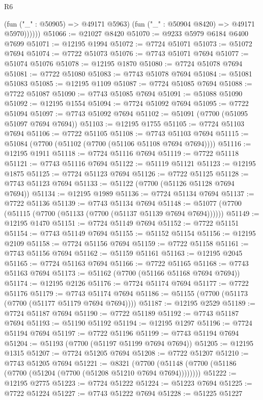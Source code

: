 \begin{lexlean}{R6}
\begin{coremodule}
              (fun ("_" : @50905) => @49171 @5963)
              (fun ("_" : @50904 @8420) => @49171 @5970))))))
@51066 := @21027 @8420
@51070 := @9233 @5979 @6184 @6400 @7699
@51071 := @12195 @1994
@51072 := @7724 @51071
@51073 := @51072 @7694
@51074 := @7722 @51073
@51076 := @7743 @51071 @7694
@51077 := @51074 @51076
@51078 := @12195 @1870
@51080 := @7724 @51078 @7694
@51081 := @7722 @51080
@51083 := @7743 @51078 @7694
@51084 := @51081 @51083
@51085 := @12195 @1109
@51087 := @7724 @51085 @7694
@51088 := @7722 @51087
@51090 := @7743 @51085 @7694
@51091 := @51088 @51090
@51092 := @12195 @1554
@51094 := @7724 @51092 @7694
@51095 := @7722 @51094
@51097 := @7743 @51092 @7694
@51102 := @51091 (@7700 (@51095 @51097 @7694 @7694))
@51103 := @12195 @1755
@51105 := @7724 @51103 @7694
@51106 := @7722 @51105
@51108 := @7743 @51103 @7694
@51115 := @51084 (@7700 (@51102 (@7700 (@51106 @51108 @7694 @7694))))
@51116 := @12195 @1911
@51118 := @7724 @51116 @7694
@51119 := @7722 @51118
@51121 := @7743 @51116 @7694
@51122 := @51119 @51121
@51123 := @12195 @1875
@51125 := @7724 @51123 @7694
@51126 := @7722 @51125
@51128 := @7743 @51123 @7694
@51133 := @51122 (@7700 (@51126 @51128 @7694 @7694))
@51134 := @12195 @1989
@51136 := @7724 @51134 @7694
@51137 := @7722 @51136
@51139 := @7743 @51134 @7694
@51148 := @51077 (@7700 (@51115 (@7700 (@51133 (@7700 (@51137 @51139 @7694 @7694))))))
@51149 := @12195 @1470
@51151 := @7724 @51149 @7694
@51152 := @7722 @51151
@51154 := @7743 @51149 @7694
@51155 := @51152 @51154
@51156 := @12195 @2109
@51158 := @7724 @51156 @7694
@51159 := @7722 @51158
@51161 := @7743 @51156 @7694
@51162 := @51159 @51161
@51163 := @12195 @2045
@51165 := @7724 @51163 @7694
@51166 := @7722 @51165
@51168 := @7743 @51163 @7694
@51173 := @51162 (@7700 (@51166 @51168 @7694 @7694))
@51174 := @12195 @2126
@51176 := @7724 @51174 @7694
@51177 := @7722 @51176
@51179 := @7743 @51174 @7694
@51186 := @51155 (@7700 (@51173 (@7700 (@51177 @51179 @7694 @7694))))
@51187 := @12195 @2529
@51189 := @7724 @51187 @7694
@51190 := @7722 @51189
@51192 := @7743 @51187 @7694
@51193 := @51190 @51192
@51194 := @12195 @1297
@51196 := @7724 @51194 @7694
@51197 := @7722 @51196
@51199 := @7743 @51194 @7694
@51204 := @51193 (@7700 (@51197 @51199 @7694 @7694))
@51205 := @12195 @1315
@51207 := @7724 @51205 @7694
@51208 := @7722 @51207
@51210 := @7743 @51205 @7694
@51221 := @8321
    (@7700 (@51148 (@7700 (@51186 (@7700 (@51204 (@7700 (@51208 @51210 @7694 @7694))))))))
@51222 := @12195 @2775
@51223 := @7724 @51222
@51224 := @51223 @7694
@51225 := @7722 @51224
@51227 := @7743 @51222 @7694
@51228 := @51225 @51227

\end{coremodule}
\end{lexlean}
